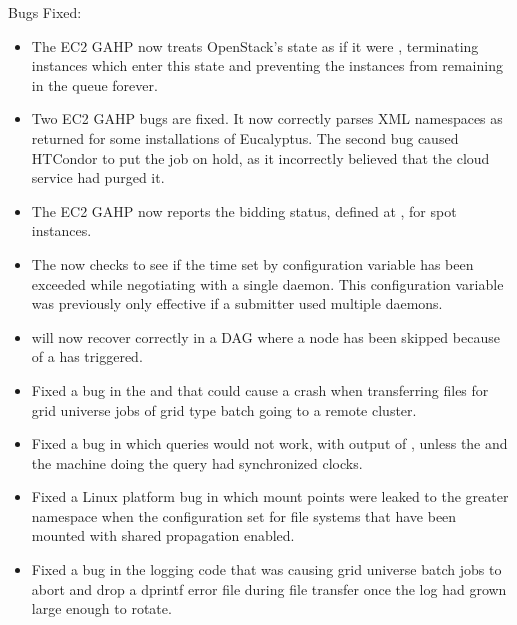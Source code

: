 \noindent Bugs Fixed:

\begin{itemize}

\item The EC2 GAHP now treats OpenStack's  state as if it
were , terminating instances which enter this state and
preventing the instances from remaining in the queue forever.

\item Two EC2 GAHP bugs are fixed.
It now correctly parses XML namespaces as returned for
some installations of Eucalyptus.
The second bug caused HTCondor to put the job on hold, 
as it incorrectly believed that the cloud
service had purged it.

\item The EC2 GAHP now reports the
bidding status, defined at
,
for spot instances. 

\item The  now checks to see if 
the time set by configuration variable 
has been exceeded while negotiating with a single  daemon.
This configuration variable was previously only effective 
if a submitter used multiple  daemons.

\item {} will now recover correctly in a DAG where a node has been 
skipped because of a  has triggered.

\item Fixed a bug in the  and  that
could cause a crash when transferring files for grid universe jobs of 
grid type batch going to a remote cluster.

\item Fixed a bug in which  queries would not work,
with output of , unless the 
and the machine doing the query had synchronized clocks.

\item Fixed a Linux platform bug in which mount points were leaked
to the greater namespace when the configuration set
 for file systems
that have been mounted with shared propagation enabled.

\item Fixed a bug in the logging code that was causing grid universe batch jobs
to abort and drop a dprintf error file during file transfer once the log had
grown large enough to rotate.

\end{itemize}

